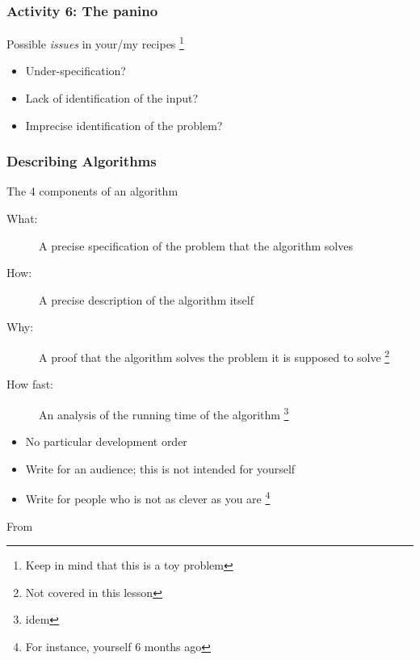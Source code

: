 \documentclass[xcolor=x11names,handout]{beamer}
\begin{document}
\begin{frame}
\frametitle{Activity 6: The panino}

Possible \textit{issues} in \alert{your/my} recipes%
\footnote{Keep in mind that this is a toy problem}
\bigskip

\begin{itemize}
 \item Under-specification?						\bigskip	\pause
 \item Lack of identification of the input?		\bigskip	\pause
 \item Imprecise identification of the problem?
\end{itemize}
\end{frame}

\begin{frame}
\frametitle{Describing Algorithms}

The 4 components of an algorithm

\begin{description}
 \item[What:] A precise specification of the problem that the algorithm solves
	\pause
 \item[How:] A precise description of the algorithm itself			\pause
 \item[Why:] A proof that the algorithm solves the problem it is supposed to
solve%
\footnote{Not covered in this lesson}			\pause
 \item[How fast:] An analysis of the running time of the algorithm%
\footnote{idem}
\end{description}	\pause

\begin{itemize}
 \item No particular development order				\pause
 \item Write for an audience; this is not intended for yourself \pause
 \item Write for people who is not as clever as you are%
\footnote{For instance, yourself 6 months ago}
\end{itemize}

\onslide
From~\cite[p. 11]{Erickson:19}
\end{frame}
\end{document}
